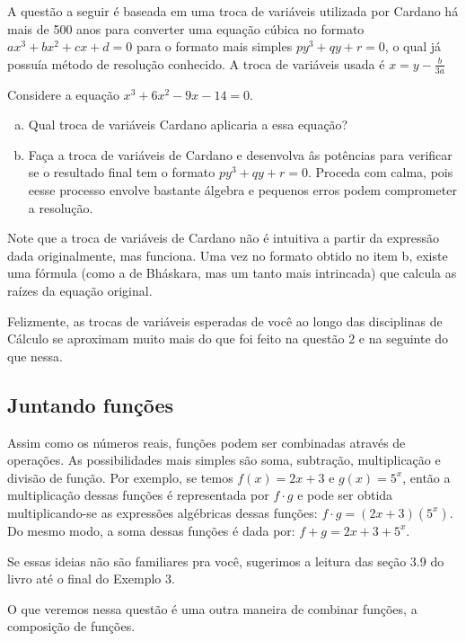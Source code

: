 \documentclass[main_estudante.tex]{subfiles}
\begin{document}
A questão a seguir é baseada em uma troca de variáveis utilizada por Cardano há mais de 500 anos para converter uma equação cúbica no formato $ax^3+bx^2+cx+d=0$ para o formato mais simples $py^3+qy+r=0$, o qual já possuía método de resolução conhecido. A troca de variáveis usada é $x=y-\frac{b}{3a}$

\begin{questao}
Considere a equação $x^3+6x^2-9x-14=0$.
\begin{enumerate}[a)]
\item Qual troca de variáveis Cardano aplicaria a essa equação?
\item Faça a troca de variáveis de Cardano e desenvolva âs potências para verificar se o resultado final tem o formato $py^3+qy+r=0$. Proceda com calma, pois eesse processo envolve bastante álgebra e pequenos erros podem comprometer a resolução.
\end{enumerate}
\end{questao}

Note que a troca de variáveis de Cardano não é intuitiva a partir da expressão dada originalmente, mas funciona. Uma vez no formato obtido no item b, existe uma fórmula (como a de Bháskara, mas um tanto mais intrincada) que calcula as raízes da equação original.

Felizmente, as trocas de variáveis esperadas de você ao longo das disciplinas de Cálculo se aproximam muito mais do que foi feito na questão 2 e na seguinte do que nessa.

\subsection*{Juntando funções}

Assim como os números reais, funções podem ser combinadas através de operações. As possibilidades mais simples são soma, subtração, multiplicação e divisão de função. Por exemplo, se temos $f(x)=2x+3$ e $g(x)=5^x$, então a multiplicação dessas funções é representada por $f \cdot g$ e pode ser obtida multiplicando-se as expressões algébricas dessas funções: $f \cdot g = (2x+3)(5^x)$. Do mesmo modo, a soma dessas funções é dada por: $f+g = 2x+3+5^x$.

Se essas ideias não são familiares pra você, sugerimos a leitura das seção 3.9 do livro  até o final do Exemplo 3.

O que veremos nessa questão é uma outra maneira de combinar funções, a composição de funções.
\end{document}
